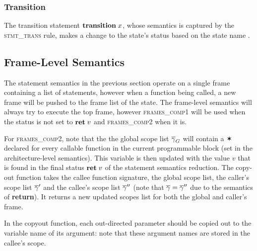 \documentclass[UTF8]{article}
\begin{document}
\begin{figure}[ht!]
    \ottusedrule{\ottdrulestmtXXext{}}
\end{figure}

\subsubsection*{Transition}
The transition statement $\mathbf{transition} \; x $, whose semantics is captured by the \textsc{stmt\_trans} rule, makes a change to the state's status \status{} based on the state name \vn{}.

\begin{figure}[ht!]
    \ottusedrule{\ottdrulestmtXXtrans{}} 
\end{figure}


\subsection{Frame-Level Semantics}
The statement semantics in the previous section operate on a single frame containing a list of statements, however when a function being called, a new frame will be pushed to the frame list of the state. The frame-level semantics will always try to execute the top frame, however \textsc{frames\_comp1} will be used when the status is not set to $\textbf{ret}\;v$ and \textsc{frames\_comp2} when it is.

For \textsc{frames\_comp2}, note that the the global scope list $\overline{\gamma}_G$ will contain a $\varstar$ declared for every callable function in the current programmable block (set in the architecture-level semantics). This variable is then updated with the value $v$ that is found in the final status $\textbf{ret}\;v$ of the statement semantics reduction. The copy-out function takes the callee function signature, the global scope list, the caller's scope list $\overline{\gamma}'$ and the callee's scope list $\overline{\gamma}''$ (note that $\overline{\gamma} = \overline{\gamma}''$ due to the semantics of \textbf{return}). It returns a new updated scopes list for both the global and caller's frame.

In the copyout function, each out-directed parameter should be copied out to the variable name of its argument: note that these argument names are stored in the callee's scope.

\begin{figure}[ht!]
    \ottusedrule{\ottdruleframesXXcompOne{}} \\
    \ottusedrule{\ottdruleframesXXcompTwo{}}
\end{figure}
\end{document}
